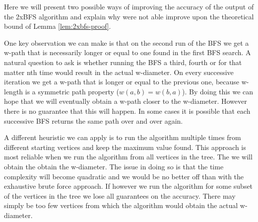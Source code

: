 
Here we will present two possible ways of improving the accuracy of the output of the 2xBFS algorithm and explain why were not able improve upon the theoretical bound of Lemma \ref{lem:2xbfs-proof}.

One key observation we can make is that on the second run of the BFS we get a w-path that is necessarily longer or equal to one found in the first BFS search. A natural question to ask is whether running the BFS a third, fourth or for that matter nth time would result in the actual w-diameter. On every successive iteration we get a w-path that is longer or equal to the previous one, because w-length is a symmetric path property ($w(a, b) = w(b, a)$). By doing this we can hope that we will eventually obtain a w-path closer to the w-diameter. However there is no guarantee that this will happen. In some cases it is possible that each successive BFS returns the same path over and over again.


A different heuristic we can apply is to run the algorithm multiple times from different starting vertices and keep the maximum value found. This approach is most reliable when we run the algorithm from all vertices in the tree. The we will obtain the obtain the w-diameter. The issue in doing so is that the time complexity will become quadratic and we would be no better off than with the exhaustive brute force approach. If however we run the algorithm for some subset of the vertices in the tree we lose all guarantees on the accuracy. There may simply be too few vertices from which the algorithm would obtain the actual w-diameter.





